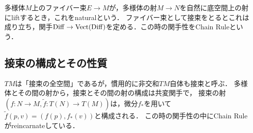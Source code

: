 \documentclass[uplatex,dvipdfmx]{jsreport}
\begin{document}
\begin{definition}
    多様体$M$上のファイバー束$E\to M$が，多様体の射$M\to N$を自然に底空間上の射にliftするとき，これをnaturalという．
    ファイバー束として接束をとるとこれは成り立ち，関手$\mathrm{Diff}\to\mathrm{Vect}(\mathrm{Diff})$を定める．この時の関手性をChain Ruleという．
\end{definition}

\subsection{接束の構成とその性質}

\begin{tcolorbox}[colframe=ForestGreen, colback=ForestGreen!10!white,breakable,colbacktitle=ForestGreen!40!white,coltitle=black,fonttitle=\bfseries\sffamily,
title=]
    $TM$は「接束の全空間」であるが，慣用的に非交和$TM$自体も接束と呼ぶ．
    多様体とその間の射から，接束とその間の射の構成は共変関手で，
    接束の射$(f:N\to M,\tilde{f}:T(N)\to T(M))$は，微分$f_*$を用いて$\tilde{f}(p,v)=(f(p),f_*(v))$と構成される．
    この時の関手性の中にChain Ruleがreincarnateしている．
\end{tcolorbox}
\end{document}
